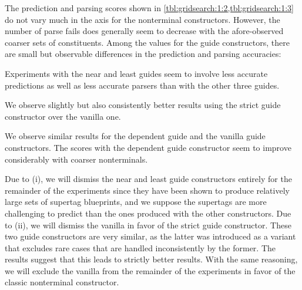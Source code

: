 \documentclass[../../document.tex]{subfiles}
\begin{document}
    The prediction and parsing scores shown in \cref{tbl:gridsearch:1:2,tbl:gridsearch:1:3} do not vary much in the axis for the nonterminal constructors.
    However, the number of parse fails does generally seem to decrease with the afore-observed coarser sets of constituents.
    Among the values for the guide constructors, there are small but observable differences in the prediction and parsing accuracies:
    \begin{compactenum}
        \item Experiments with the near and least guides seem to involve less accurate predictions as well as less accurate parsers than with the other three guides.
        \item We observe slightly but also consistently better results using the strict guide constructor over the vanilla one.
        \item We observe similar results for the dependent guide and the vanilla guide constructors. The scores with the dependent guide constructor seem to improve considerably with coarser nonterminals.
    \end{compactenum}

    Due to (i), we will dismiss the near and least guide constructors entirely for the remainder of the experiments since they have been shown to produce relatively large sets of supertag blueprints, and we suppose the supertags are more challenging to predict than the ones produced with the other constructors.
    Due to (ii), we will dismiss the vanilla in favor of the strict guide constructor.
    These two guide constructors are very similar, as the latter was introduced as a variant that excludes rare cases that are handled inconsistently by the former.
    The results suggest that this leads to strictly better results.
    With the same reasoning, we will exclude the vanilla from the remainder of the experiments in favor of the classic nonterminal constructor.
    
\end{document}
